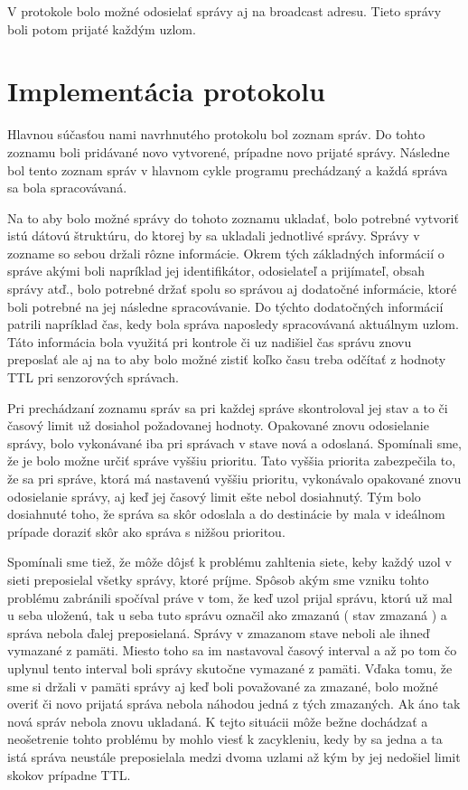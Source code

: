 \documentclass[slovak,master]{diploma}
\begin{document}
V protokole bolo možné odosielať správy aj na broadcast adresu. Tieto správy boli potom prijaté každým uzlom.

\section{Implementácia protokolu}
Hlavnou súčasťou nami navrhnutého protokolu bol zoznam správ. Do tohto zoznamu boli pridávané novo vytvorené, 
prípadne novo prijaté správy. Následne bol tento zoznam správ v hlavnom cykle programu prechádzaný a každá správa sa bola spracovávaná.

Na to aby bolo možné správy do tohoto zoznamu ukladať, bolo potrebné vytvoriť istú dátovú štruktúru, do ktorej by sa ukladali jednotlivé správy.
Správy v zozname so sebou držali rôzne informácie. Okrem tých základných informácií o správe akými boli napríklad jej identifikátor, odosielateľ a prijímateľ, obsah správy atď., 
bolo potrebné držať spolu so správou aj dodatočné informácie, ktoré boli potrebné na jej následne spracovávanie. Do týchto dodatočných informácií patrili napríklad 
čas, kedy bola správa naposledy spracovávaná aktuálnym uzlom. Táto informácia bola využitá pri kontrole či uz nadišiel čas správu znovu preposlať ale aj 
na to aby bolo možné zistiť koľko času treba odčítať z hodnoty TTL pri senzorových správach.

Pri prechádzaní zoznamu správ sa pri každej správe skontroloval jej stav a to či časový limit už dosiahol požadovanej hodnoty. Opakované znovu odosielanie 
správy, bolo vykonávané iba pri správach v stave nová a odoslaná. Spomínali sme, že je bolo možne určiť správe vyššiu prioritu. Tato vyššia priorita zabezpečila to, že sa pri správe, 
ktorá má nastavenú vyššiu prioritu, vykonávalo opakované znovu odosielanie správy, aj keď jej časový limit ešte nebol dosiahnutý. Tým bolo dosiahnuté toho, že správa sa 
skôr odoslala a do destinácie by mala v ideálnom prípade doraziť skôr ako správa s nižšou prioritou.

Spomínali sme tiež, že môže dôjsť k problému zahltenia siete, keby každý uzol v sieti preposielal všetky správy, ktoré príjme. Spôsob akým sme vzniku tohto problému zabránili 
spočíval práve v tom, že keď uzol prijal správu, ktorú už mal u seba uloženú, tak u seba tuto správu označil ako zmazanú ( stav zmazaná ) a správa nebola ďalej preposielaná. 
Správy v zmazanom stave neboli ale ihneď vymazané z pamäti. Miesto toho sa im nastavoval časový interval a až po tom čo uplynul tento interval boli správy skutočne vymazané z pamäti. 
Vďaka tomu, že sme si držali v pamäti správy aj keď boli považované za zmazané, bolo možné overiť či novo prijatá správa nebola náhodou jedná z tých zmazaných. Ak áno tak nová 
správ nebola znovu ukladaná. K tejto situácii môže bežne dochádzať a neošetrenie tohto problému by mohlo viesť k zacykleniu, kedy by sa jedna a ta istá správa neustále 
preposielala medzi dvoma uzlami až kým by jej nedošiel limit skokov prípadne TTL.
\end{document}
